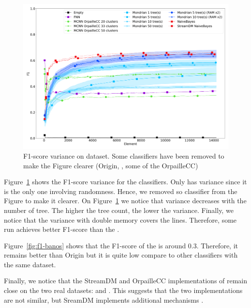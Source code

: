\begin{figure}
		\includegraphics[width=\linewidth]{figures/results/banos_6_f1_std.png}
		\caption{F1-score variance on \banosdataset dataset. Some classifiers
		have been removed to make the Figure clearer (\mcnn Origin,
		\hoeffdingtree, some of the \mcnn OrpailleCC)}
		\label{fig:f1-variance}
\end{figure}

Figure~\ref{fig:f1-variance} shows the F1-score variance for the classifiers.
Only \mondrianforest has variance since it is the only one involving
randomness. Hence, we removed so classifier from the Figure to make it clearer.
On Figure~\ref{fig:f1-variance} we notice that \mondrianforest variance
decreases with the number of tree. The higher the tree count, the lower the
variance. Finally, we notice that the \mondrianforest variance with double
memory covers the \naivebayes lines. Therefore, some \mondrianforest run
achieves better F1-score than the \naivebayes.

Figure~\ref{fig:f1-banos} shows that the F1-score of the \FNN
is around 0.3. Therefore, it remains better than \mcnn Origin but it is quite
low compare to other classifiers with the same dataset.

Finally, we notice that the StreamDM and OrpailleCC implementations of
\naivebayes remain close on the two real datasets: \banosdataset and
\recofitdataset.  This suggests that the two implementations are not similar,
but SreamDM implements additional mechanisms .

